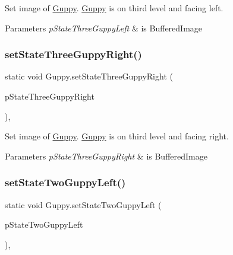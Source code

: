 Set image of \mbox{\hyperlink{class_guppy}{Guppy}}. \mbox{\hyperlink{class_guppy}{Guppy}} is on third level and facing left.


\begin{DoxyParams}{Parameters}
{\em p\+State\+Three\+Guppy\+Left} & is Buffered\+Image \\
\hline
\end{DoxyParams}
\mbox{\label{class_guppy_aff40345fa3a3ace95695a3bad8ebe1a5}} 
\subsubsection{\texorpdfstring{set\+State\+Three\+Guppy\+Right()}{setStateThreeGuppyRight()}}
{\footnotesize\ttfamily static void Guppy.\+set\+State\+Three\+Guppy\+Right (\begin{DoxyParamCaption}\item[{final Buffered\+Image}]{p\+State\+Three\+Guppy\+Right }\end{DoxyParamCaption})\hspace{0.3cm}{\ttfamily [inline]}, {\ttfamily [static]}}

Set image of \mbox{\hyperlink{class_guppy}{Guppy}}. \mbox{\hyperlink{class_guppy}{Guppy}} is on third level and facing right.


\begin{DoxyParams}{Parameters}
{\em p\+State\+Three\+Guppy\+Right} & is Buffered\+Image \\
\hline
\end{DoxyParams}
\mbox{\label{class_guppy_a7f916a9190171f6311d2404913fb2df6}} 
\subsubsection{\texorpdfstring{set\+State\+Two\+Guppy\+Left()}{setStateTwoGuppyLeft()}}
{\footnotesize\ttfamily static void Guppy.\+set\+State\+Two\+Guppy\+Left (\begin{DoxyParamCaption}\item[{final Buffered\+Image}]{p\+State\+Two\+Guppy\+Left }\end{DoxyParamCaption})\hspace{0.3cm}{\ttfamily [inline]}, {\ttfamily [static]}}

